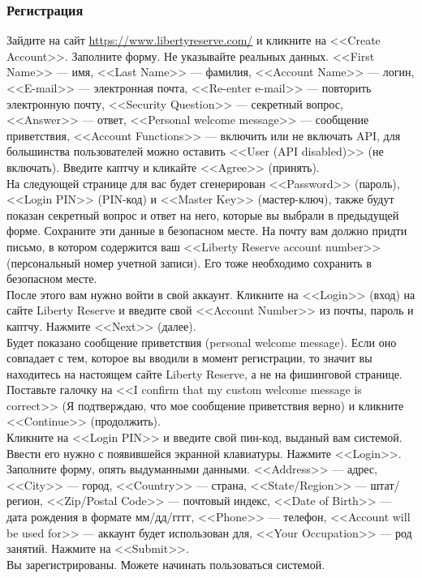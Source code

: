 \subsubsection{Регистрация}
Зайдите на сайт \url{https://www.libertyreserve.com/} и кликните на <<Create Account>>. Заполните форму. Не указывайте реальных данных. <<First Name>> --- имя, <<Last Name>> --- фамилия, <<Account Name>> --- логин, <<E-mail>> --- электронная почта, <<Re-enter e-mail>> --- повторить электронную почту, <<Security Question>> --- секретный вопрос, <<Answer>> --- ответ, <<Personal welcome message>> --- сообщение приветствия, <<Account Functions>> --- включить или не включать API, для большинства пользователей можно оставить <<User (API disabled)>> (не включать). Введите каптчу и кликайте <<Agree>> (принять).\\
На следующей странице для вас будет сгенерирован <<Password>> (пароль), <<Login PIN>> (PIN-код) и <<Master Key>> (мастер-ключ), также будут показан секретный вопрос и ответ на него, которые вы выбрали в предыдущей форме. Сохраните эти данные в безопасном месте. На почту вам должно придти письмо, в котором содержится ваш <<Liberty Reserve account number>> (персональный номер учетной записи). Его тоже необходимо сохранить в безопасном месте.\\
После этого вам нужно войти в свой аккаунт. Кликните на <<Login>> (вход) на сайте Liberty Reserve и введите свой <<Account Number>> из почты, пароль и каптчу. Нажмите <<Next>> (далее).\\
Будет показано сообщение приветствия (personal welcome message). Если оно совпадает с тем, которое вы вводили в момент регистрации, то значит вы находитесь на настоящем сайте Liberty Reserve, а не на фишинговой странице. Поставьте галочку на <<I confirm that my custom welcome message is correct>> (Я подтверждаю, что мое сообщение приветствия верно) и кликните <<Continue>> (продолжить).\\
Кликните на <<Login PIN>> и введите свой пин-код, выданый вам системой. Ввести его нужно с появившейся экранной клавиатуры. Нажмите <<Login>>.\\
Заполните форму, опять выдуманными данными. <<Address>> --- адрес, <<City>> --- город, <<Country>> --- страна, <<State/Region>> --- штат/регион, <<Zip/Postal Code>> --- почтовый индекс, <<Date of Birth>> --- дата рождения в формате мм/дд/гггг, <<Phone>> --- телефон, <<Account will be used for>> --- аккаунт будет использован для, <<Your Occupation>> --- род занятий. Нажмите на <<Submit>>.\\
Вы зарегистрированы. Можете начинать пользоваться системой.
